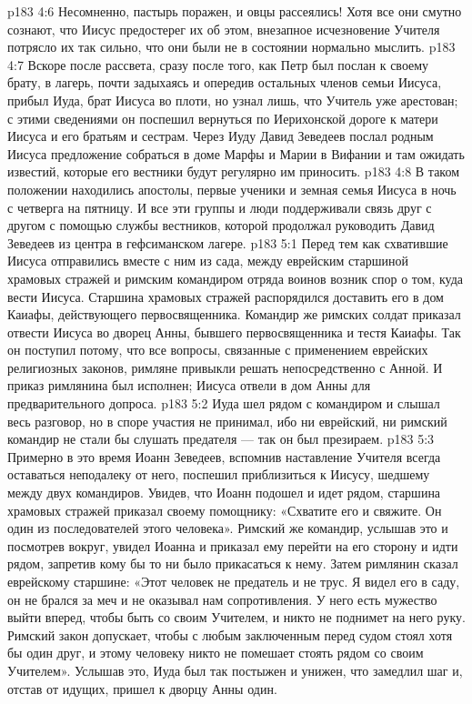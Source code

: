 \vs p183 4:6 Несомненно, пастырь поражен, и овцы рассеялись! Хотя все они смутно сознают, что Иисус предостерег их об этом, внезапное исчезновение Учителя потрясло их так сильно, что они были не в состоянии нормально мыслить.
\vs p183 4:7 Вскоре после рассвета, сразу после того, как Петр был послан к своему брату, в лагерь, почти задыхаясь и опередив остальных членов семьи Иисуса, прибыл Иуда, брат Иисуса во плоти, но узнал лишь, что Учитель уже арестован; с этими сведениями он поспешил вернуться по Иерихонской дороге к матери Иисуса и его братьям и сестрам. Через Иуду Давид Зеведеев послал родным Иисуса предложение собраться в доме Марфы и Марии в Вифании и там ожидать известий, которые его вестники будут регулярно им приносить.
\vs p183 4:8 В таком положении находились апостолы, первые ученики и земная семья Иисуса в ночь с четверга на пятницу. И все эти группы и люди поддерживали связь друг с другом с помощью службы вестников, которой продолжал руководить Давид Зеведеев из центра в гефсиманском лагере.
\vs p183 5:1 Перед тем как схватившие Иисуса отправились вместе с ним из сада, между еврейским старшиной храмовых стражей и римским командиром отряда воинов возник спор о том, куда вести Иисуса. Старшина храмовых стражей распорядился доставить его в дом Каиафы, действующего первосвященника. Командир же римских солдат приказал отвести Иисуса во дворец Анны, бывшего первосвященника и тестя Каиафы. Так он поступил потому, что все вопросы, связанные с применением еврейских религиозных законов, римляне привыкли решать непосредственно с Анной. И приказ римлянина был исполнен; Иисуса отвели в дом Анны для предварительного допроса.
\vs p183 5:2 Иуда шел рядом с командиром и слышал весь разговор, но в споре участия не принимал, ибо ни еврейский, ни римский командир не стали бы слушать предателя --- так он был презираем.
\vs p183 5:3 Примерно в это время Иоанн Зеведеев, вспомнив наставление Учителя всегда оставаться неподалеку от него, поспешил приблизиться к Иисусу, шедшему между двух командиров. Увидев, что Иоанн подошел и идет рядом, старшина храмовых стражей приказал своему помощнику: «Схватите его и свяжите. Он один из последователей этого человека». Римский же командир, услышав это и посмотрев вокруг, увидел Иоанна и приказал ему перейти на его сторону и идти рядом, запретив кому бы то ни было прикасаться к нему. Затем римлянин сказал еврейскому старшине: «Этот человек не предатель и не трус. Я видел его в саду, он не брался за меч и не оказывал нам сопротивления. У него есть мужество выйти вперед, чтобы быть со своим Учителем, и никто не поднимет на него руку. Римский закон допускает, чтобы с любым заключенным перед судом стоял хотя бы один друг, и этому человеку никто не помешает стоять рядом со своим Учителем». Услышав это, Иуда был так постыжен и унижен, что замедлил шаг и, отстав от идущих, пришел к дворцу Анны один.
